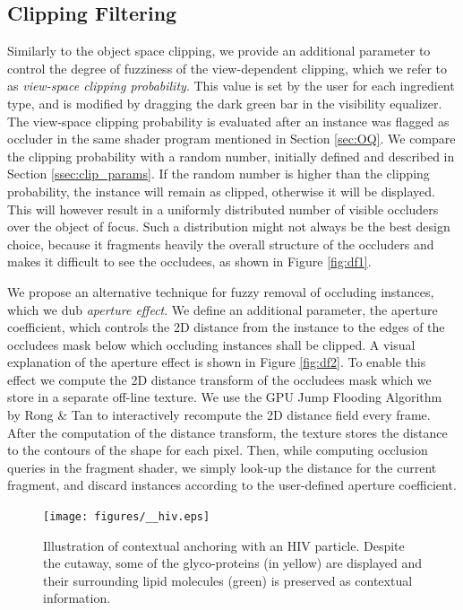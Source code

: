 \subsection{Clipping Filtering}

Similarly to the object space clipping, we provide an additional parameter to control the degree of fuzziness of the view-dependent clipping, which we refer to as \emph{view-space clipping probability}.
This value is set by the user for each ingredient type, and is modified by dragging the dark green bar in the visibility equalizer.
The view-space clipping probability is evaluated after an instance was flagged as occluder in the same shader program mentioned in Section \ref{sec:OQ}.
We compare the clipping probability with a random number, initially defined and described in Section \ref{ssec:clip_params}.
If the random number is higher than the clipping probability, the instance will remain as clipped, otherwise it will be displayed. 
This will however result in a uniformly distributed number of visible occluders over the object of focus. 
Such a distribution might not always be the best design choice, because it fragments heavily the overall structure of the occluders and makes it difficult to see the occludees, as shown in Figure \ref{fig:df1}.

We propose an alternative technique for fuzzy removal of occluding instances, which we dub \emph{aperture effect}.
We define an additional parameter, the aperture coefficient, which controls the 2D distance from the instance to the edges of the occludees mask below which occluding instances shall be clipped.
A visual explanation of the aperture effect is shown in Figure \ref{fig:df2}.
To enable this effect we compute the 2D distance transform of the occludees mask which we store in a separate off-line texture.
We use the GPU Jump Flooding Algorithm by Rong \& Tan \cite{Rong06} to interactively recompute the 2D distance field every frame. 
After the computation of the distance transform, the texture stores the distance to the contours of the shape for each pixel.
Then, while computing occlusion queries in the fragment shader, we simply look-up the distance for the current fragment, and discard instances according to the user-defined aperture coefficient.



\begin{figure}[t]
\centering
\texttt{[image: figures/\_\_hiv.eps]}
\caption{\label{fig:hiv-islands} 
Illustration of contextual anchoring with an HIV particle. 
Despite the cutaway, some of the glyco-proteins (in yellow) are displayed and their surrounding lipid molecules (green) is preserved as contextual information.}
\vspace{-5mm}
\end{figure}

